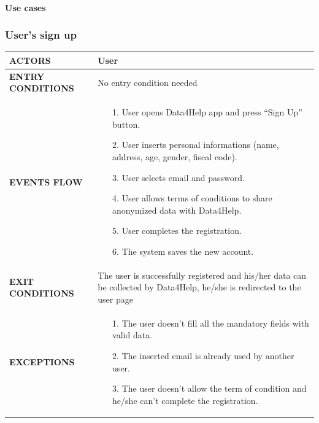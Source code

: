\documentclass[a4paper]{article}
\begin{document}

\paragraph{Use cases}

\subsubsection{User's sign up}
\begin{center}
    \begin{tabular}{ l || p{8cm} ||}
        \bf{ACTORS} & User \\ 
        \hline
        \bf{ENTRY CONDITIONS} & No entry condition needed  \\ 
        \hline
        \bf{EVENTS FLOW} & \begin{itemize}[noitemsep, topsep=0cm, leftmargin=*] \vspace{-0.2cm}
            \item[1.] User opens Data4Help app and press “Sign Up” button.
            \item[2.] User inserts personal informations (name, address, age, gender, fiscal code).
            \item[3.] User selects email and password.
            \item[4.] User allows terms of conditions to share anonymized data with Data4Help.
            \item[5.] User completes the registration.
            \item[6.] The system saves the new account.
        \end{itemize}\\ 
        \hline
        \bf{EXIT CONDITIONS} & The user is successfully registered and his/her data can be collected by Data4Help, he/she is redirected to the user page\\ \hline
        \bf{EXCEPTIONS} & \begin{itemize}[noitemsep, topsep=0cm, leftmargin=*] \vspace{-0.2cm}
            \item[1.] The user doesn’t fill all the mandatory fields with valid data.
            \item[2.]The inserted email is already used by another user.
            \item[3.] The user doesn’t allow the term of condition and he/she can’t complete the registration.
        \end{itemize}
        \\ \hline \hline
    \end{tabular}
\end{center}
\end{document}
